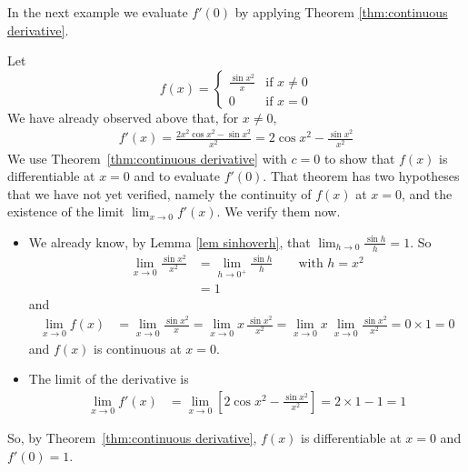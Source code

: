 In the next example we evaluate $f'(0)$ by applying 
Theorem \ref{thm:continuous derivative}.
\begin{eg}\label{eg:continuous derivative}
Let 
\begin{equation*}
f(x) = \begin{cases}
            \frac{\sin x^2}{x} &\text{if $x\ne 0$} \\
             0                  &\text{if $x=0$}
        \end{cases}
\end{equation*}
We have already observed above that, for $x\ne 0$,
\begin{align*}
f'(x) = \frac{2x^2\cos x^2 -\sin x^2}{x^2}
      = 2\cos x^2 - \frac{\sin x^2}{x^2}
\end{align*}
We use Theorem~\ref{thm:continuous derivative} with $c=0$ to show that $f(x)$ is differentiable at $x=0$ and to evaluate $f'(0)$. That theorem 
has two hypotheses that we have not yet verified, namely the continuity of 
$f(x)$ at $x=0$, and the existence of the limit $\lim_{x\rightarrow 0}f'(x)$.
We verify them now.
\begin{itemize}
\item We already know, by Lemma \ref{lem sinhoverh},
that $\lim_{h\rightarrow 0}\frac{\sin h}{h}=1$. So
\begin{align*}
\lim_{x\rightarrow 0}\frac{\sin x^2}{x^2} 
&=\lim_{h\rightarrow 0^+}\frac{\sin h}{h}\qquad\text{with $h=x^2$} \\
&=1
\end{align*}
and
\begin{align*}
\lim_{x\rightarrow 0} f(x) 
&=\lim_{x\rightarrow 0}\frac{\sin x^2}{x}
=\lim_{x\rightarrow 0}x\,\frac{\sin x^2}{x^2}
=\lim_{x\rightarrow 0}x\ \lim_{x\rightarrow 0}\frac{\sin x^2}{x^2}
=0\times 1
=0
\end{align*}
and $f(x)$ is continuous at $x=0$.
\item The limit of the derivative is
\begin{align*}
\lim_{x\rightarrow 0}f'(x) 
&= \lim_{x\rightarrow 0}\left[2\cos x^2 - \frac{\sin x^2}{x^2}\right]
=2\times 1 -1 = 1
\end{align*}
\end{itemize}
So, by Theorem~\ref{thm:continuous derivative}, $f(x)$ is differentiable 
at $x=0$ and $f'(0)=1$.
\end{eg}





